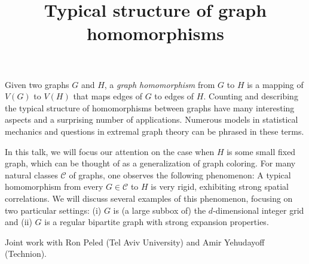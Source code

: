 \title{Typical structure of graph homomorphisms}
\endtitle

Given two graphs $G$ and $H$, a \emph{graph homomorphism} from $G$ to $H$ is a mapping of $V(G)$ to $V(H)$ that maps edges of $G$ to edges of $H$. Counting and describing the typical structure of homomorphisms between graphs have many interesting aspects and a surprising number of applications. Numerous models in statistical mechanics and questions in extremal graph theory can be phrased in these terms.

In this talk, we will focus our attention on the case when $H$ is some small fixed graph, which can be thought of as a generalization of graph coloring. For many natural classes $\mathcal{C}$ of graphs, one observes the following phenomenon: A typical homomorphism from every $G \in \mathcal{C}$ to $H$ is very rigid, exhibiting strong spatial correlations. We will discuss several examples of this phenomenon, focusing on two particular settings: (i) $G$ is (a large subbox of) the $d$-dimensional integer grid and (ii) $G$ is a regular bipartite graph with strong expansion properties.

Joint work with Ron Peled (Tel Aviv University) and Amir Yehudayoff (Technion).
